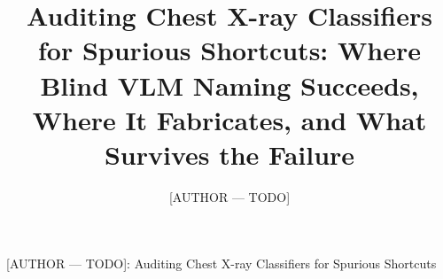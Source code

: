 \documentclass{ieeeaccess}
\begin{document}

\title{Auditing Chest X-ray Classifiers for Spurious Shortcuts: Where Blind VLM Naming Succeeds, Where It Fabricates, and What Survives the Failure}

\author{[AUTHOR --- TODO]}
\address[1]{[AFFILIATION / DEPARTMENT --- TODO], [CITY, COUNTRY --- TODO] (e-mail: [EMAIL --- TODO])}


{[AUTHOR --- TODO]: Auditing Chest X-ray Classifiers for Spurious Shortcuts}

\end{document}
